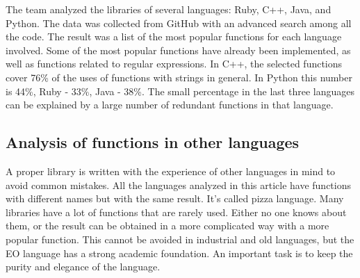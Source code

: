 \documentclass[11pt,nonacm,natbib=false]{acmart}
\begin{document}
The team analyzed the libraries of several languages: Ruby, C++, Java, and Python. The data was collected from GitHub with an advanced search among all the code. The result was a list of the most popular functions for each language involved. Some of the most popular functions have already been implemented, as well as functions related to regular expressions. In C++, the selected functions cover 76\% of the uses of functions with strings in general. In Python this number is 44\%, Ruby - 33\%, Java - 38\%. The small percentage in the last three languages can be explained by a large number of redundant functions in that language.

\subsection{Analysis of functions in other languages}
A proper library is written with the experience of other languages in mind to avoid common mistakes. All the languages analyzed in this article have functions with different names but with the same result. It's called pizza language. Many libraries have a lot of functions that are rarely used. Either no one knows about them, or the result can be obtained in a more complicated way with a more popular function. This cannot be avoided in industrial and old languages, but the EO language has a strong academic foundation. An important task is to keep the purity and elegance of the language.
\end{document}
